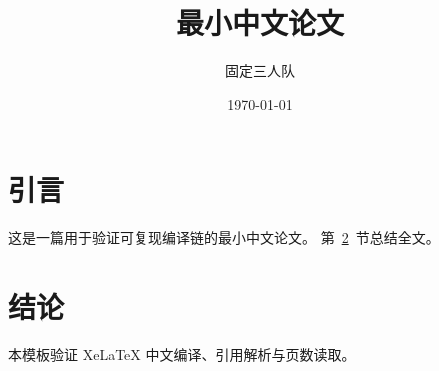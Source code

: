 \documentclass[11pt]{article}
\title{最小中文论文}
\author{固定三人队}
\date{\today}
\begin{document}
\maketitle
\section{引言}\label{sec:intro}
这是一篇用于验证可复现编译链的最小中文论文。
第~\ref{sec:conclusion}~节总结全文。
\section{结论}\label{sec:conclusion}
本模板验证 XeLaTeX 中文编译、引用解析与页数读取。
\end{document}
